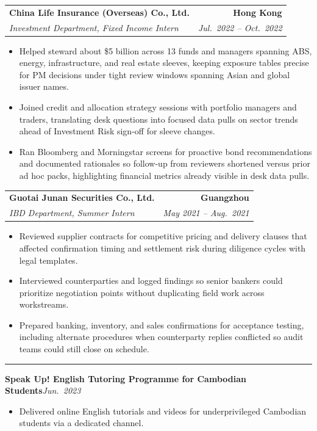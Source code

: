 \documentclass[9pt,a4paper]{extarticle}
\makeatletter
\newcommand{\ressection}[1]{%
  \vspace{0.8em}%
  \noindent{\large\scshape\bfseries #1}\par\nobreak
  \vspace{-\parskip}%
  \vspace{-\parskip}%
  \vspace{-\parskip}%
  \vspace{-\parskip}%
  \noindent\rule{\linewidth}{0.1pt}\par\nobreak
  \vspace{-\parskip}%
}
\newcommand{\resumeSubheading}[4]{%
  \vspace{0.6em}%
  \begin{tabular*}{\textwidth}{l@{\extracolsep{\fill}}r}
    \textbf{#1} & \textbf{#2} \\
    \textit{\small #3} & \textit{\small #4} \\
  \end{tabular*}\vspace{0.32em}}
\newcommand{\resumeHeading}[2]{%
  \vspace{0.15em}%
  \noindent\textbf{\small #1}\hfill\textit{\small #2}\par\vspace{0.1em}}
\makeatother
\begin{document}
\resumeSubheading{China Life Insurance (Overseas) Co., Ltd.}{Hong Kong}{Investment Department, Fixed Income Intern}{Jul.\ 2022 -- Oct.\ 2022}
\begin{itemize}
  \item Helped steward about \$5 billion across 13 funds and managers spanning ABS, energy, infrastructure, and real estate sleeves, keeping exposure tables precise for PM decisions under tight review windows spanning Asian and global issuer names.
  \item Joined credit and allocation strategy sessions with portfolio managers and traders, translating desk questions into focused data pulls on sector trends ahead of Investment Risk sign-off for sleeve changes.
  \item Ran Bloomberg and Morningstar screens for proactive bond recommendations and documented rationales so follow-up from reviewers shortened versus prior ad hoc packs, highlighting financial metrics already visible in desk data pulls.
\end{itemize}

\resumeSubheading{Guotai Junan Securities Co., Ltd.}{Guangzhou}{IBD Department, Summer Intern}{May 2021 -- Aug.\ 2021}
\begin{itemize}
  \item Reviewed supplier contracts for competitive pricing and delivery clauses that affected confirmation timing and settlement risk during diligence cycles with legal templates.
  \item Interviewed counterparties and logged findings so senior bankers could prioritize negotiation points without duplicating field work across workstreams.
  \item Prepared banking, inventory, and sales confirmations for acceptance testing, including alternate procedures when counterparty replies conflicted so audit teams could still close on schedule.
\end{itemize}


\ressection{Extracurricular Activities}

\resumeHeading{Speak Up! English Tutoring Programme for Cambodian Students}{Jun.\ 2023}
\begin{itemize}
  \item Delivered online English tutorials and videos for underprivileged Cambodian students via a dedicated channel.
\end{itemize}
\end{document}
